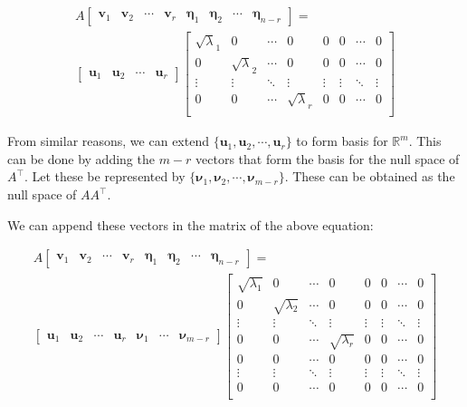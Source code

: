 \documentclass[a4paper]{article}
\begin{document}
\begin{equation}
\begin{aligned}
A \begin{bmatrix}
\boldsymbol{v}_1 & \boldsymbol{v}_2 & \cdots & \boldsymbol{v}_r &  \boldsymbol{\eta}_1 & \boldsymbol{\eta}_2 & \cdots & \boldsymbol{\eta}_{n-r}
\end{bmatrix} = \\ \begin{bmatrix}
\boldsymbol{u}_1 & \boldsymbol{u}_2 & \cdots & \boldsymbol{u}_r
\end{bmatrix} \begin{bmatrix}
\sqrt{\lambda}_1 & 0 & \cdots &0 & 0 & 0 & \cdots & 0 \\
0 & \sqrt{\lambda}_2 & \cdots & 0 & 0 & 0 & \cdots & 0\\
\vdots & \vdots & \ddots & \vdots & \vdots & \vdots & \ddots & \vdots \\
0 & 0 & \cdots &\sqrt{\lambda}_r & 0 & 0 & \cdots & 0 \\
\end{bmatrix}
\end{aligned}
\end{equation}

From similar reasons, we can extend $\{
\boldsymbol{u}_1, \boldsymbol{u}_2, \cdots, \boldsymbol{u}_r
\}$ to form basis for $\mathbb{R}^m$. This can be done by adding the $m-r$ vectors that form the basis for the null space of $A^{\top}$. Let these be represented by $\{ \boldsymbol{\nu}_1, \boldsymbol{\nu}_2, \cdots, \boldsymbol{\nu}_{m-r} \}$. These can be obtained as the null space of $AA^{\top}$.

We can append these vectors in the matrix of the above equation:

\begin{equation}
\begin{aligned}
A \begin{bmatrix}
\boldsymbol{v}_1 & \boldsymbol{v}_2 & \cdots & \boldsymbol{v}_r &  \boldsymbol{\eta}_1 & \boldsymbol{\eta}_2 & \cdots & \boldsymbol{\eta}_{n-r}
\end{bmatrix} = \\
\begin{bmatrix}
\boldsymbol{u}_1 & \boldsymbol{u}_2 & \cdots & \boldsymbol{u}_r & \boldsymbol{\nu}_1 & \cdots & \boldsymbol{\nu}_{m-r}
\end{bmatrix} \begin{bmatrix}
\sqrt{\lambda_1} & 0 & \cdots &0 & 0 & 0 & \cdots & 0 \\
0 & \sqrt{\lambda_2} & \cdots & 0 & 0 & 0 & \cdots & 0\\
\vdots & \vdots & \ddots & \vdots & \vdots & \vdots & \ddots & \vdots \\
0 & 0 & \cdots & \sqrt{\lambda_r} & 0 & 0 & \cdots & 0 \\
0 & 0 & \cdots & 0 & 0 & 0 & \cdots & 0 \\
\vdots & \vdots & \ddots & \vdots & \vdots & \vdots & \ddots & \vdots \\
0 & 0 & \cdots & 0 & 0 & 0 & \cdots & 0 \\
\end{bmatrix}
\end{aligned}
\end{equation}
\end{document}
